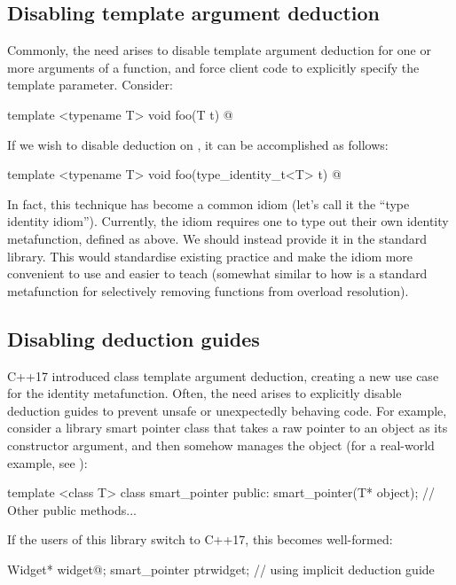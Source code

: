 \subsection{Disabling template argument deduction}
Commonly, the need arises to disable template argument deduction for one or more arguments of a function, and force client code to explicitly specify the template parameter. Consider:
\begin{codeblock}
template <typename T>
void foo(T t) {@\commentellip@}
\end{codeblock}
If we wish to disable deduction on , it can be accomplished as follows:
\begin{codeblock}
template <typename T>
void foo(type_identity_t<T> t) {@\commentellip@}
\end{codeblock}
In fact, this technique has become a common idiom (let's call it the ``type identity idiom''). Currently, the idiom requires one to type out their own identity metafunction, defined as above. We should instead provide it in the standard library. This would standardise existing practice and make the idiom more convenient to use and easier to teach (somewhat similar to how  is a standard metafunction for selectively removing functions from overload resolution).

\subsection{Disabling deduction guides}
C++17 introduced class template argument deduction, creating a new use case for the identity metafunction. Often, the need arises to explicitly disable deduction guides to prevent unsafe or unexpectedly behaving code. For example, consider a library smart pointer class that takes a raw pointer to an object as its constructor argument, and then somehow manages the object (for a real-world example, see \cite{JuceScopedPointer}):

\begin{codeblock}
template <class T>
class smart_pointer
{
public:
    smart_pointer(T* object);
    // Other public methods...
}
\end{codeblock}

If the users of this library switch to C++17, this becomes well-formed:

\begin{codeblock}
Widget* widget{@\commentellip@};
smart_pointer ptr{widget};  // using implicit deduction guide
\end{codeblock}

